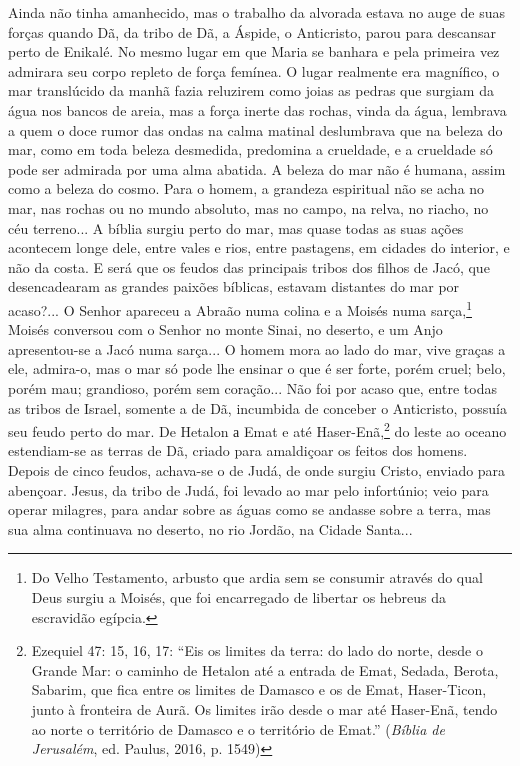 Ainda não tinha amanhecido, mas o trabalho da alvorada estava no auge de
suas forças quando Dã, da tribo de Dã, a Áspide, o Anticristo, parou
para descansar perto de Enikalé. No mesmo lugar em que Maria se banhara
e pela primeira vez admirara seu corpo repleto de força femínea. O lugar
realmente era magnífico, o mar translúcido da manhã fazia reluzirem como
joias as pedras que surgiam da água nos bancos de areia, mas a força
inerte das rochas, vinda da água, lembrava a quem o doce rumor das ondas
na calma matinal deslumbrava que na beleza do mar, como em toda beleza
desmedida, predomina a crueldade, e a crueldade só pode ser admirada por
uma alma abatida. A beleza do mar não é humana, assim como a beleza do
cosmo. Para o homem, a grandeza espiritual não se acha no mar, nas
rochas ou no mundo absoluto, mas no campo, na relva, no riacho, no céu
terreno... A bíblia surgiu perto do mar, mas quase todas as suas ações
acontecem longe dele, entre vales e rios, entre pastagens, em cidades do
interior, e não da costa. E será que os feudos das principais tribos dos
filhos de Jacó, que desencadearam as grandes paixões bíblicas, estavam
distantes do mar por acaso?... O Senhor apareceu a Abraão numa colina e
a Moisés numa sarça,\footnote{Do Velho Testamento, arbusto que ardia sem
  se consumir através do qual Deus surgiu a Moisés, que foi encarregado
  de libertar os hebreus da escravidão egípcia.} Moisés conversou com o
Senhor no monte Sinai, no deserto, e um Anjo apresentou-se a Jacó numa
sarça... O homem mora ao lado do mar, vive graças a ele, admira-o, mas o
mar só pode lhe ensinar o que é ser forte, porém cruel; belo, porém mau;
grandioso, porém sem coração... Não foi por acaso que, entre todas as
tribos de Israel, somente a de Dã, incumbida de conceber o Anticristo,
possuía seu feudo perto do mar. De Hetalon а Emat e até
Haser-Enã,\footnote{Ezequiel 47: 15, 16, 17: ``Eis os limites da terra:
  do lado do norte, desde o Grande Mar: o caminho de Hetalon até a
  entrada de Emat, Sedada, Berota, Sabarim, que fica entre os limites de
  Damasco e os de Emat, Haser-Ticon, junto à fronteira de Aurã. Os
  limites irão desde o mar até Haser-Enã, tendo ao norte o território de
  Damasco e o território de Emat.'' (\emph{Bíblia de Jerusalém}, ed.
  Paulus, 2016, p. 1549)} do leste ao oceano estendiam-se as terras de
Dã, criado para amaldiçoar os feitos dos homens. Depois de cinco feudos,
achava-se o de Judá, de onde surgiu Cristo, enviado para abençoar.
Jesus, da tribo de Judá, foi levado ao mar pelo infortúnio; veio para
operar milagres, para andar sobre as águas como se andasse sobre a
terra, mas sua alma continuava no deserto, no rio Jordão, na Cidade
Santa...

